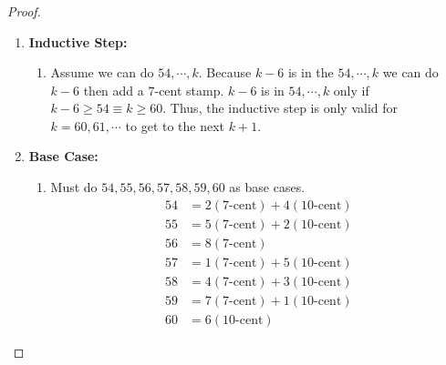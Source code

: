 \documentclass[class=article, crop=false]{standalone}
\begin{document}
\subsubsection{}
\begin{proof}
	$ $
	\begin{enumerate}
	  \item[] \textbf{Inductive Step:}
		\begin{enumerate}
		  \item[]
		  Assume we can do $54,\cdots,k$. Because $k-6$ is in the $54,\cdots,k$ we can do $k-6$ then add a $7$-cent stamp.
		  $k-6$ is in $54,\cdots,k$ only if $k-6\geq 54 \equiv k\geq60$.
		  Thus, the inductive step is only valid for $k=60,61,\cdots$ to get to the next $k+1$.
		\end{enumerate} 
	  \item[] \textbf{Base Case:}
		\begin{enumerate}
		  \item[] Must do $54,55,56,57,58,59,60$ as base cases.
		  \begin{align*}
			54 &= 2(7\text{-cent}) + 4(10\text{-cent})\\
			55 &= 5(7\text{-cent}) + 2(10\text{-cent})\\
			56 &= 8(7\text{-cent})\\
			57 &= 1(7\text{-cent}) + 5(10\text{-cent})\\
			58 &= 4(7\text{-cent}) + 3(10\text{-cent})\\
			59 &= 7(7\text{-cent}) + 1(10\text{-cent})\\
			60 &= 6(10\text{-cent})
		  \end{align*} 
		\end{enumerate}
	\end{enumerate}
  \end{proof}

\setcounter{subsection}{2}
\end{document}
